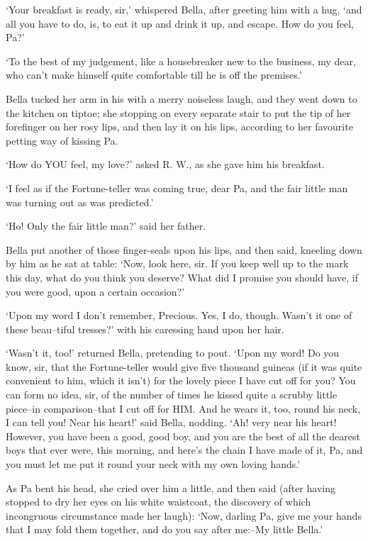‘Your breakfast is ready, sir,’ whispered Bella, after greeting him with
a hug, ‘and all you have to do, is, to eat it up and drink it up, and
escape. How do you feel, Pa?’

‘To the best of my judgement, like a housebreaker new to the business,
my dear, who can’t make himself quite comfortable till he is off the
premises.’

Bella tucked her arm in his with a merry noiseless laugh, and they went
down to the kitchen on tiptoe; she stopping on every separate stair to
put the tip of her forefinger on her rosy lips, and then lay it on his
lips, according to her favourite petting way of kissing Pa.

‘How do YOU feel, my love?’ asked R. W., as she gave him his breakfast.

‘I feel as if the Fortune-teller was coming true, dear Pa, and the fair
little man was turning out as was predicted.’

‘Ho! Only the fair little man?’ said her father.

Bella put another of those finger-seals upon his lips, and then said,
kneeling down by him as he sat at table: ‘Now, look here, sir. If you
keep well up to the mark this day, what do you think you deserve?
What did I promise you should have, if you were good, upon a certain
occasion?’

‘Upon my word I don’t remember, Precious. Yes, I do, though. Wasn’t
it one of these beau--tiful tresses?’ with his caressing hand upon her
hair.

‘Wasn’t it, too!’ returned Bella, pretending to pout. ‘Upon my word! Do
you know, sir, that the Fortune-teller would give five thousand guineas
(if it was quite convenient to him, which it isn’t) for the lovely piece
I have cut off for you? You can form no idea, sir, of the number of
times he kissed quite a scrubby little piece--in comparison--that I cut
off for HIM. And he wears it, too, round his neck, I can tell you! Near
his heart!’ said Bella, nodding. ‘Ah! very near his heart! However, you
have been a good, good boy, and you are the best of all the dearest boys
that ever were, this morning, and here’s the chain I have made of
it, Pa, and you must let me put it round your neck with my own loving
hands.’

As Pa bent his head, she cried over him a little, and then said (after
having stopped to dry her eyes on his white waistcoat, the discovery of
which incongruous circumstance made her laugh): ‘Now, darling Pa,
give me your hands that I may fold them together, and do you say after
me:--My little Bella.’

